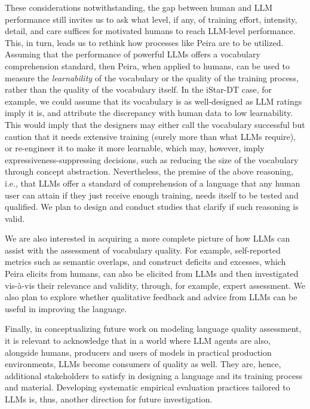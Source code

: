 These considerations notwithstanding, the gap between human and LLM performance still invites us to ask what level, if any, of training effort, intensity, detail, and care suffices for motivated humans to reach LLM-level performance. This, in turn, leads us to rethink how processes like Peira are to be utilized. Assuming that the performance of powerful LLMs offers a vocabulary comprehension standard, then Peira, when applied to humans, can be used to measure the \textit{learnability} of the vocabulary or the quality of the training process, rather than the quality of the vocabulary itself. In the iStar-DT case, for example, we could assume that its vocabulary is as well-designed as LLM ratings imply it is, and attribute the discrepancy with human data to low learnability. This would imply that the designers may either call the vocabulary successful but caution that it needs extensive training (surely more than what LLMs require), or re-engineer it to make it more learnable, which may, however, imply expressiveness-suppressing decisions, such as reducing the size of the vocabulary through concept abstraction. Nevertheless, the premise of the above reasoning, i.e., that LLMs offer a standard of comprehension of a language that any human user can attain if they just receive enough training, needs itself to be tested and qualified. We plan to design and conduct studies that clarify if such reasoning is valid. 

We are also interested in acquiring a more complete picture of how LLMs can assist with the assessment of vocabulary quality. For example, self-reported metrics such as semantic overlaps, and construct deficits and excesses, which Peira elicits from humans, can also be elicited from LLMs and then investigated vis-\`{a}-vis their relevance and validity, through, for example, expert assessment. We also plan to explore whether qualitative feedback and advice from LLMs can be useful in improving the language. 

Finally, in conceptualizing future work on modeling language quality assessment, it is relevant to acknowledge that in a world where LLM agents are also, alongside humans, producers and users of models in practical production environments, LLMs become consumers of quality as well. They are, hence, additional stakeholders to satisfy in designing a language and its training process and material. Developing systematic empirical evaluation practices tailored to LLMs is, thus, another direction for future investigation.



